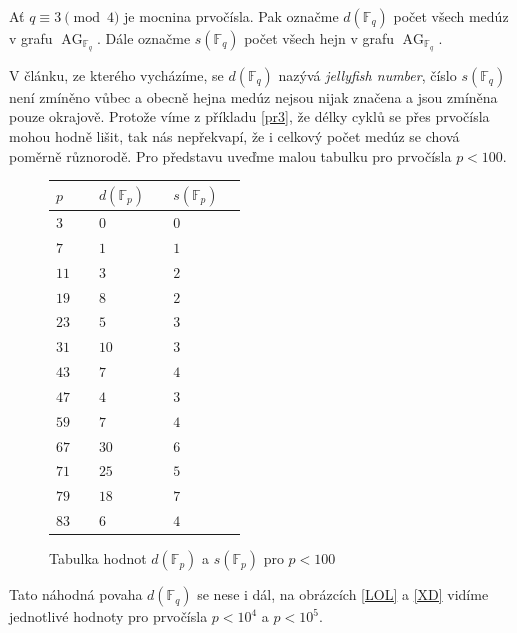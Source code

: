 \documentclass[12pt]{report}
\DeclareMathOperator{\AG}{AG}
\begin{document}
\begin{definice}
Ať $q \equiv 3 \pmod{4}$ je mocnina prvočísla. Pak označme $d(\mathbb{F}_q)$ počet všech medúz v grafu $\AG_{\mathbb{F}_q}$. Dále označme $s(\mathbb{F}_q)$ počet všech hejn v grafu $\AG_{\mathbb{F}_q}$.
\end{definice}

V článku, ze kterého vycházíme, se $d(\mathbb{F}_q)$ nazývá \textit{jellyfish number}, číslo $s(\mathbb{F}_q)$ není zmíněno vůbec a obecně hejna medúz nejsou nijak značena a jsou zmíněna pouze okrajově. Protože víme z příkladu \ref{pr3}, že délky cyklů se přes prvočísla mohou hodně lišit, tak nás nepřekvapí, že i celkový počet medúz se chová poměrně různorodě. Pro představu uveďme malou tabulku pro prvočísla $p < 100$.

\begin{figure}[h]
 \begin{longtable}[H]{>{\raggedright\arraybackslash}p{0.15\linewidth}p{0.15\linewidth}p{0.15\linewidth}}
\toprule
$p$ & $d(\mathbb{F}_p)$ & $s(\mathbb{F}_p)$\\
\midrule
$3$ & \noindent $0$ & \noindent $0$\\
$7$ & \noindent $1$ & \noindent $1$\\
$11$ & \noindent $3$ & \noindent $2$\\
$19$ & \noindent $8$ & \noindent $2$\\
$23$ & \noindent $5$ & \noindent $3$\\
$31$ & \noindent $10$ & \noindent $3$\\
$43$ & \noindent $7$ & \noindent $4$\\
$47$ & \noindent $4$ & \noindent $3$\\
$59$ & \noindent $7$ & \noindent $4$\\
$67$ & \noindent $30$ & \noindent $6$\\
$71$ & \noindent $25$ & \noindent $5$\\
$79$ & \noindent $18$ & \noindent $7$\\
$83$ & \noindent $6$ & \noindent $4$\\
\bottomrule 
\end{longtable}
\caption{Tabulka hodnot $d(\mathbb{F}_p)$ a $s(\mathbb{F}_p)$ pro $p < 100$}
\end{figure}


Tato náhodná povaha $d(\mathbb{F}_q)$ se nese i dál, na obrázcích \ref{LOL} a \ref{XD} vidíme jednotlivé hodnoty pro prvočísla $p < 10^4$ a $p < 10^5$.
\end{document}
